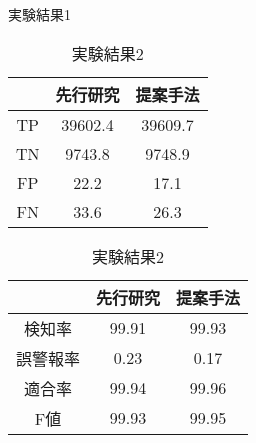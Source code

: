 \begin{table}[tb]
  \centering
  \begin{minipage}{0.45\textwidth}  %
      \centering
      \caption{実験結果1}  %
      \begin{tabular}{|c|c|c|}  %
          \hline  %
          ~ &先行研究 & 提案手法\\  %
          \hline  %
          TP & 39602.4 & 39609.7\\  %
          \hline  %
          TN & 9743.8 & 9748.9\\  %
          \hline  %
          FP & 22.2 & 17.1\\  %
          \hline  %
          FN & 33.6 & 26.3\\  %
          \hline  %
      \end{tabular}
      \label{result2}  %
  \end{minipage} \hspace{1cm}  %
  \begin{minipage}{0.45\textwidth}  %
      \centering
      \caption{実験結果2}  %
      \begin{tabular}{|c|c|c|}  %
          \hline  %
          ~ &先行研究 & 提案手法\\  %
          \hline  %
          検知率 & 99.91 & 99.93\\  %
          \hline  %
          誤警報率 & 0.23 & 0.17\\  %
          \hline  %
          適合率 & 99.94 & 99.96\\  %
          \hline  %
          F値 & 99.93 & 99.95\\  %
          \hline  %
      \end{tabular}
      \label{result3}  %
  \end{minipage}
\end{table}
